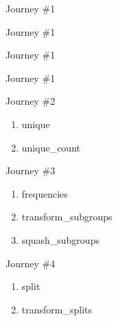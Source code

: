 \documentclass[10pt]{beamer}
\begin{document}
\begin{frame}{Journey \#1}
    \begin{block}{}
		
	\end{block}
\end{frame}
\begin{frame}{Journey \#1}
    \begin{block}{}
		
	\end{block}
\end{frame}

\begin{frame}{Journey \#1}
    \begin{block}{}
		
	\end{block}
\end{frame}

\begin{frame}{Journey \#1}
    \begin{block}{}
		
	\end{block}
\end{frame}

\begin{frame}{Journey \#2}
    \begin{enumerate}
        \item unique
        \item unique\_count
    \end{enumerate}
\end{frame}

\begin{frame}{Journey \#3}
    \begin{enumerate}
        \item frequencies 
        \item transform\_subgroups
        \item squash\_subgroups
    \end{enumerate}
\end{frame}

\begin{frame}{Journey \#4}
    \begin{enumerate}
        \item split
        \item transform\_splits
    \end{enumerate}
\end{frame}
\end{document}
